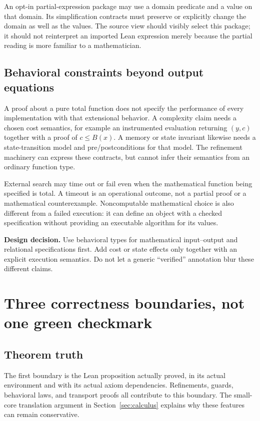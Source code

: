 \documentclass[11pt,a4paper]{article}
\newcommand{\decision}[1]{\par\smallskip\textbf{Design decision.} #1\par\smallskip}
\theoremstyle{plain}
\theoremstyle{definition}
\theoremstyle{remark}
\begin{document}
An opt-in partial-expression package may use a domain predicate and a value
on that domain. Its simplification contracts must preserve or explicitly
change the domain as well as the values. The source view should visibly select
this package; it should not reinterpret an imported Lean expression merely
because the partial reading is more familiar to a mathematician.

\subsection{Behavioral constraints beyond output equations}
A proof about a pure total function does not specify the performance of every
implementation with that extensional behavior. A complexity claim needs a
chosen cost semantics, for example an instrumented evaluation returning
$(y,c)$ together with a proof of $c\le B(x)$. A memory or state invariant
likewise needs a state-transition model and pre/postconditions for that model.
The refinement machinery can express these contracts, but cannot infer their
semantics from an ordinary function type.

External search may time out or fail even when the mathematical function being
specified is total. A timeout is an operational outcome, not a partial proof
or a mathematical counterexample. Noncomputable mathematical choice is also
different from a failed execution: it can define an object with a checked
specification without providing an executable algorithm for its values.

\decision{Use behavioral types for mathematical input--output and relational
specifications first. Add cost or state effects only together with an explicit
execution semantics. Do not let a generic ``verified'' annotation blur these
different claims.}

\section{Three correctness boundaries, not one green checkmark}
\label{sec:boundaries}
\subsection{Theorem truth}
The first boundary is the Lean proposition actually proved, in its actual
environment and with its actual axiom dependencies. Refinements, guards,
behavioral laws, and transport proofs all contribute to this boundary. The
small-core translation argument in Section~\ref{sec:calculus} explains why
these features can remain conservative.
\end{document}
